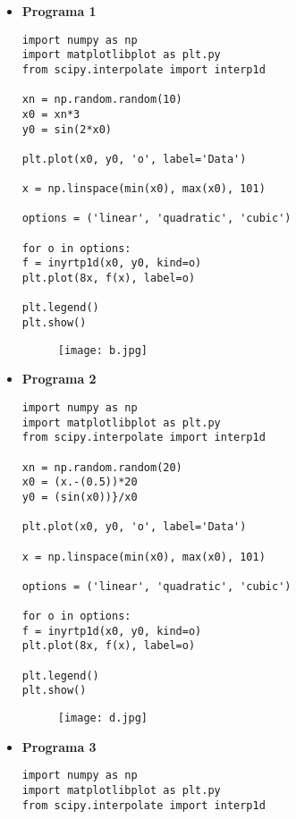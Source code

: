 \documentclass[a4paper]{article}
\begin{document}
\begin{itemize}
\item \textbf{Programa 1} \\ 
\begin{verbatim}
import numpy as np
import matplotlibplot as plt.py
from scipy.interpolate import interp1d

xn = np.random.random(10)
x0 = xn*3
y0 = sin(2*x0)

plt.plot(x0, y0, 'o', label='Data')

x = np.linspace(min(x0), max(x0), 101)

options = ('linear', 'quadratic', 'cubic')

for o in options:
f = inyrtp1d(x0, y0, kind=o)
plt.plot(8x, f(x), label=o)

plt.legend()
plt.show()

\end{verbatim}



\begin{figure}[H]
	\centering
	\texttt{[image: b.jpg]}
\end{figure}

\item \textbf{Programa 2} \\
\begin{verbatim}
import numpy as np
import matplotlibplot as plt.py
from scipy.interpolate import interp1d

xn = np.random.random(20)
x0 = (x.-(0.5))*20
y0 = (sin(x0))}/x0

plt.plot(x0, y0, 'o', label='Data')

x = np.linspace(min(x0), max(x0), 101)

options = ('linear', 'quadratic', 'cubic')

for o in options:
f = inyrtp1d(x0, y0, kind=o)
plt.plot(8x, f(x), label=o)

plt.legend()
plt.show()

\end{verbatim}



\begin{figure}[H]
	\centering
	\texttt{[image: d.jpg]}
\end{figure}

\item \textbf{Programa 3} \\
\begin{verbatim}
import numpy as np
import matplotlibplot as plt.py
from scipy.interpolate import interp1d


\end{verbatim}
\end{itemize}
\end{document}
